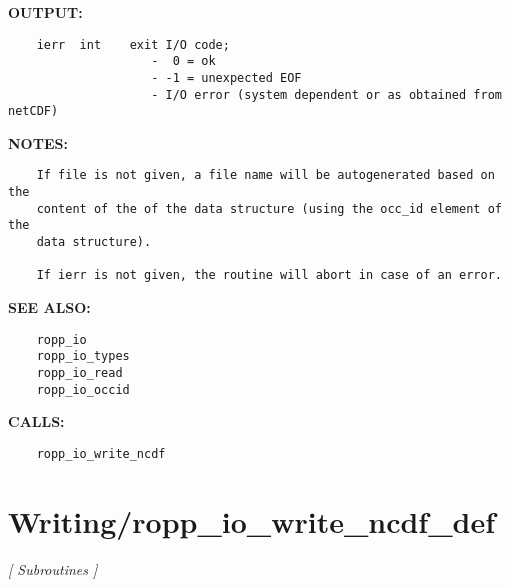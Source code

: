 \textbf{OUTPUT:}\hspace{0.08in}\begin{Verbatim}
    ierr  int    exit I/O code;
                    -  0 = ok
                    - -1 = unexpected EOF
                    - I/O error (system dependent or as obtained from netCDF)
\end{Verbatim}
\textbf{NOTES:}\hspace{0.08in}\begin{Verbatim}
    If file is not given, a file name will be autogenerated based on the
    content of the of the data structure (using the occ_id element of the
    data structure).

    If ierr is not given, the routine will abort in case of an error.
\end{Verbatim}
\textbf{SEE ALSO:}\hspace{0.08in}\begin{Verbatim}
    ropp_io
    ropp_io_types
    ropp_io_read
    ropp_io_occid
\end{Verbatim}
\textbf{CALLS:}\hspace{0.08in}\begin{Verbatim}
    ropp_io_write_ncdf
\end{Verbatim}
\section{Writing/ropp\_io\_write\_ncdf\_def}
\textsl{[ Subroutines ]}

